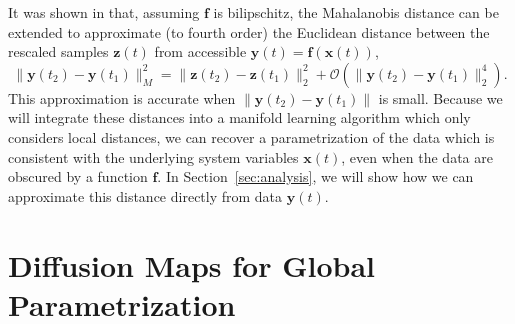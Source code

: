 %
It was shown in \cite{singer2008non} that, assuming $\mathbf{f}$ is bilipschitz, the Mahalanobis distance can be extended to approximate (to fourth order) the Euclidean distance between the rescaled samples $\mathbf{z}(t)$ from accessible $\mathbf{y}(t) = \mathbf{f} (\mathbf{x}(t))$,
%
\begin{equation} \label{eq:mahalanobis2}
\| \mathbf{y}(t_2) - \mathbf{y}(t_1) \|^2_M = \| \mathbf{z}(t_2) - \mathbf{z}(t_1) \|^2_2 + \mathcal{O}(\| \mathbf{y}(t_2) - \mathbf{y}(t_1) \|^4_2).
\end{equation}
%
This approximation is accurate when $\| \mathbf{y}(t_2) - \mathbf{y}(t_1) \|$ is small.
%
Because we will integrate these distances into a manifold learning algorithm which only considers local distances, we can recover a parametrization of the data which is consistent with the underlying system variables $\mathbf{x}(t)$, even when the data are obscured by a function $\mathbf{f}$.
%
In Section~\ref{sec:analysis}, we will show how we can approximate this distance directly from data $\mathbf{y}(t)$.
%

\section{Diffusion Maps for Global Parametrization}

